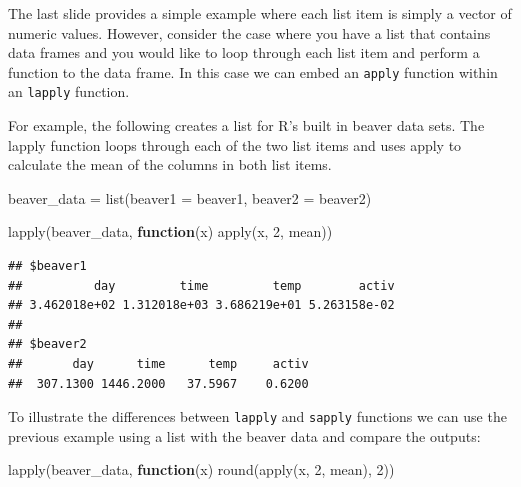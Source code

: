 \documentclass[
]{book}
\newenvironment{Shaded}{\begin{snugshade}}{\end{snugshade}}
\newcommand{\AttributeTok}[1]{\textcolor[rgb]{0.77,0.63,0.00}{#1}}
\newcommand{\ControlFlowTok}[1]{\textcolor[rgb]{0.13,0.29,0.53}{\textbf{#1}}}
\newcommand{\DecValTok}[1]{\textcolor[rgb]{0.00,0.00,0.81}{#1}}
\newcommand{\FunctionTok}[1]{\textcolor[rgb]{0.00,0.00,0.00}{#1}}
\newcommand{\NormalTok}[1]{#1}
\newcommand{\OtherTok}[1]{\textcolor[rgb]{0.56,0.35,0.01}{#1}}
\theoremstyle{definition}
\theoremstyle{definition}
\theoremstyle{definition}
\theoremstyle{definition}
\theoremstyle{remark}
\begin{document}
The last slide provides a simple example where each list item is simply a vector of numeric values. However, consider the case where you have a list that contains data frames and you would like to loop through each list item and perform a function to the data frame. In this case we can embed an \texttt{apply} function within an \texttt{lapply} function.

For example, the following creates a list for R's built in beaver data sets. The lapply function loops through each of the two list items and uses apply to calculate the mean of the columns in both list items.

\begin{Shaded}
\begin{Highlighting}[]
\NormalTok{beaver\_data }\OtherTok{=} \FunctionTok{list}\NormalTok{(}\AttributeTok{beaver1 =}\NormalTok{ beaver1, }
                    \AttributeTok{beaver2 =}\NormalTok{ beaver2)}
\end{Highlighting}
\end{Shaded}

\begin{Shaded}
\begin{Highlighting}[]
\FunctionTok{lapply}\NormalTok{(beaver\_data, }\ControlFlowTok{function}\NormalTok{(x) }\FunctionTok{apply}\NormalTok{(x, }\DecValTok{2}\NormalTok{, mean))}
\end{Highlighting}
\end{Shaded}

\begin{verbatim}
## $beaver1
##          day         time         temp        activ 
## 3.462018e+02 1.312018e+03 3.686219e+01 5.263158e-02 
## 
## $beaver2
##       day      time      temp     activ 
##  307.1300 1446.2000   37.5967    0.6200
\end{verbatim}

To illustrate the differences between \texttt{lapply} and \texttt{sapply} functions we can use the previous example using a list with the beaver data and compare the outputs:

\begin{Shaded}
\begin{Highlighting}[]
\FunctionTok{lapply}\NormalTok{(beaver\_data, }\ControlFlowTok{function}\NormalTok{(x) }\FunctionTok{round}\NormalTok{(}\FunctionTok{apply}\NormalTok{(x, }\DecValTok{2}\NormalTok{, mean), }\DecValTok{2}\NormalTok{))}
\end{Highlighting}
\end{Shaded}
\end{document}
